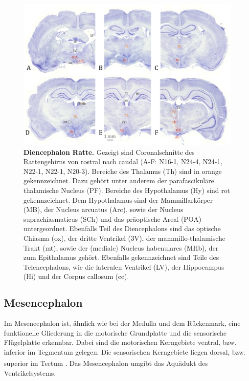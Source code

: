 \documentclass[12pt,a4paper,pdftex]{article}
\begin{document}
\begin{figure}[H]
	    \centering
	    \includegraphics[width=\textwidth]{pictures/Bilder_Jule/Ratte/hypothalamus.png}
	    \caption[Diencephalon Ratte]{\textbf{Diencephalon Ratte.} Gezeigt sind Coronalschnitte des Rattengehirns von rostral nach caudal (A-F: N16-1, N24-4, N24-1, N22-1, N22-1, N20-3). Bereiche des Thalamus (Th) sind in orange gekennzeichnet. Dazu gehört unter anderem der parafascikuläre thalamische Nucleus (PF). Bereiche des Hypothalamus (Hy) sind rot gekennzeichnet. Dem Hypothalamus sind der Mammillarkörper (MB), der Nucleus arcuatus (Arc), sowie der Nucleus suprachiasmaticus (SCh) und das präoptische Areal (POA) untergeordnet. Ebenfalls Teil des Diencephalons sind das optische Chiasma (ox), der dritte Ventrikel (3V), der mammillo-thalamische Trakt (mt), sowie der (mediale) Nucleus habenulares (MHb), der zum Epithalamus gehört. Ebenfalls gekennzeichnet sind Teile des Telencephalons, wie die lateralen Ventrikel (LV), der Hippocampus (Hi) und der Corpus callosum (cc).}
	    \label{fig:Diencephalon_Ratte}
\end{figure}{}



\subsection{Mesencephalon}
\label{subsec:Mesencephalon} 

Im Mesencephalon ist, ähnlich wie bei der Medulla und dem Rückenmark, eine funktionelle Gliederung in die motorische Grundplatte und die sensorische Flügelplatte erkennbar. Dabei sind die motorischen Kerngebiete ventral, bzw. inferior im Tegmentum gelegen. Die sensorischen Kerngebiete liegen dorsal, bzw. superior im Tectum \textsuperscript{\cite[6]{trepel2011neuroanatomie}}. Das Mesencephalon umgibt das Aquädukt des Ventrikelsystems.
\end{document}
